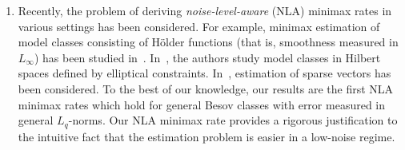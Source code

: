 \begin{enumerate}
    \item Recently, the problem of deriving \emph{noise-level-aware} (NLA) minimax rates in various settings has been considered. For example,  minimax estimation of model classes consisting of H\"older functions (that is, smoothness measured in $L_\infty$) has been studied in~\cite{morkisz2020complexity}. In~\cite{10.1214/24-AOS2446}, the authors study model classes in Hilbert spaces defined by elliptical constraints. In~\cite{10374243,guo2024note,ghosh2025signal}, estimation of sparse vectors has been considered. To the best of our knowledge, our results are  the first NLA minimax rates which hold for general Besov classes with error measured in general $L_q$-norms. Our NLA minimax rate provides a rigorous justification to the intuitive fact that the estimation problem is easier in a low-noise regime. 
\end{enumerate}

